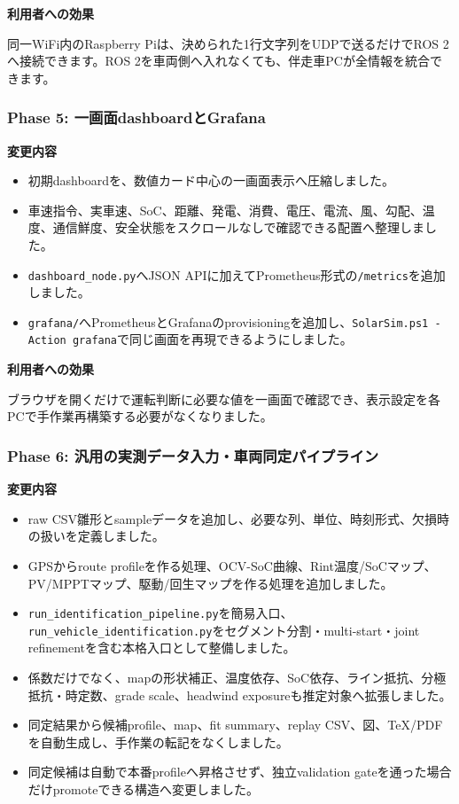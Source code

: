 \documentclass[
  japanese,
  a4paper,
  11pt]{article}
\providecommand{\tightlist}{%
  \setlength{\itemsep}{0pt}\setlength{\parskip}{0pt}}
\begin{document}
\textbf{利用者への効果}

同一WiFi内のRaspberry Piは、決められた1行文字列をUDPで送るだけでROS
2へ接続できます。ROS
2を車両側へ入れなくても、伴走車PCが全情報を統合できます。

\subsubsection{Phase 5:
一画面dashboardとGrafana}\label{phase-5-ux4e00ux753bux9762dashboardux3068grafana}

\textbf{変更内容}

\begin{itemize}
\tightlist
\item
  初期dashboardを、数値カード中心の一画面表示へ圧縮しました。
\item
  車速指令、実車速、SoC、距離、発電、消費、電圧、電流、風、勾配、温度、通信鮮度、安全状態をスクロールなしで確認できる配置へ整理しました。
\item
  \texttt{dashboard\_node.py}へJSON
  APIに加えてPrometheus形式の\texttt{/metrics}を追加しました。
\item
  \texttt{grafana/}へPrometheusとGrafanaのprovisioningを追加し、\texttt{SolarSim.ps1\ -Action\ grafana}で同じ画面を再現できるようにしました。
\end{itemize}

\textbf{利用者への効果}

ブラウザを開くだけで運転判断に必要な値を一画面で確認でき、表示設定を各PCで手作業再構築する必要がなくなりました。

\subsubsection{Phase 6:
汎用の実測データ入力・車両同定パイプライン}\label{phase-6-ux6c4eux7528ux306eux5b9fux6e2cux30c7ux30fcux30bfux5165ux529bux8ecaux4e21ux540cux5b9aux30d1ux30a4ux30d7ux30e9ux30a4ux30f3}

\textbf{変更内容}

\begin{itemize}
\tightlist
\item
  raw
  CSV雛形とsampleデータを追加し、必要な列、単位、時刻形式、欠損時の扱いを定義しました。
\item
  GPSからroute
  profileを作る処理、OCV-SoC曲線、Rint温度/SoCマップ、PV/MPPTマップ、駆動/回生マップを作る処理を追加しました。
\item
  \texttt{run\_identification\_pipeline.py}を簡易入口、\texttt{run\_vehicle\_identification.py}をセグメント分割・multi-start・joint
  refinementを含む本格入口として整備しました。
\item
  係数だけでなく、mapの形状補正、温度依存、SoC依存、ライン抵抗、分極抵抗・時定数、grade
  scale、headwind exposureも推定対象へ拡張しました。
\item
  同定結果から候補profile、map、fit summary、replay
  CSV、図、TeX/PDFを自動生成し、手作業の転記をなくしました。
\item
  同定候補は自動で本番profileへ昇格させず、独立validation
  gateを通った場合だけpromoteできる構造へ変更しました。
\end{itemize}
\end{document}

